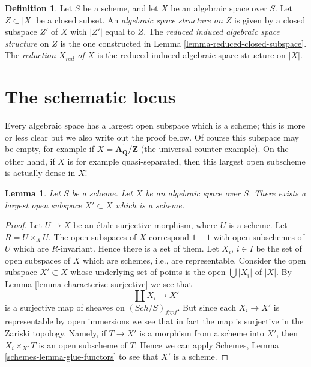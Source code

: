 \documentclass{stacks-project}
\theoremstyle{plain}
\newtheorem{lemma}[subsection]{Lemma}
\theoremstyle{definition}
\newtheorem{definition}[subsection]{Definition}
\theoremstyle{remark}
\numberwithin{equation}{subsection}
\def\Sch{\mathit{Sch}}
\begin{document}
\begin{definition}
\label{definition-reduced-induced-space}
Let $S$ be a scheme, and let $X$ be an algebraic space over $S$.
Let $Z \subset |X|$ be a closed subset.
An {\it algebraic space structure on $Z$} is given by a closed subspace
$Z'$ of $X$ with $|Z'|$ equal to $Z$.
The {\it reduced induced algebraic space structure}
on $Z$ is the one constructed in
Lemma \ref{lemma-reduced-closed-subspace}.
The {\it reduction $X_{red}$ of $X$} is the reduced induced algebraic
space structure on $|X|$.
\end{definition}











\section{The schematic locus}
\label{section-schematic}

\noindent
Every algebraic space has a largest open subspace which is a
scheme; this is more or less clear but we also write out the proof below.
Of course this subspace may be empty, for example if
$X = \mathbf{A}^1_{\mathbf{Q}}/\mathbf{Z}$ (the universal
counter example). On the other hand, if $X$ is for example quasi-separated,
then this largest open subscheme is actually dense in $X$!

\begin{lemma}
\label{lemma-subscheme}
Let $S$ be a scheme.
Let $X$ be an algebraic space over $S$.
There exists a largest open subspace $X' \subset X$ which is a scheme.
\end{lemma}

\begin{proof}
Let $U \to X$ be an \'etale surjective morphism, where $U$ is a scheme.
Let $R = U \times_X U$. The open subspaces of $X$ correspond $1 - 1$
with open subschemes of $U$ which are $R$-invariant. Hence there is a
set of them. Let $X_i$, $i \in I$ be the set of open subspaces
of $X$ which are schemes, i.e., are representable. Consider the
open subspace $X' \subset X$ whose underlying set of points is
the open $\bigcup |X_i|$ of $|X|$. By
Lemma \ref{lemma-characterize-surjective}
we see that
$$
\coprod X_i \longrightarrow X'
$$
is a surjective map of sheaves on $(\Sch/S)_{fppf}$.
But since each $X_i \to X'$ is representable by open immersions
we see that in fact the map is surjective in the Zariski
topology. Namely, if $T \to X'$ is a morphism from a scheme
into $X'$, then $X_i \times_{X'} T$ is an open subscheme of $T$.
Hence we can apply
Schemes, Lemma \ref{schemes-lemma-glue-functors}
to see that $X'$ is a scheme.
\end{proof}
\end{document}
